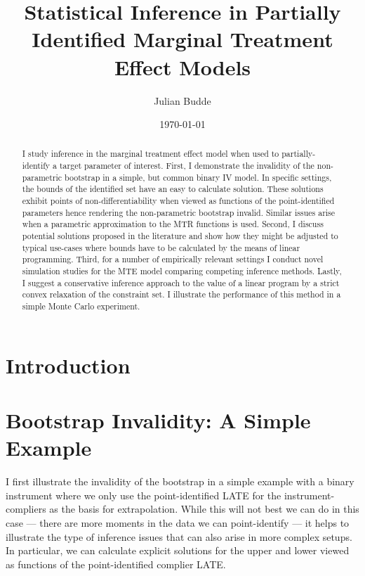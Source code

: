 \documentclass[12pt,a4paper,english]{article} %
\title{Statistical Inference in Partially Identified Marginal Treatment Effect Models}
\author{Julian Budde}
\date{\today}
\numberwithin{equation}{section}
\theoremstyle{definition}
\theoremstyle{remark}
\theoremstyle{plain}
\begin{document}
\maketitle

\begin{abstract}
	I study inference in the marginal treatment effect model when used to partially-identify a target parameter of interest.
	First, I demonstrate the invalidity of the non-parametric bootstrap in a simple, but common binary IV model.
	In specific settings, the bounds of the identified set have an easy to calculate solution.
	These solutions exhibit points of non-differentiability when viewed as functions of the point-identified parameters hence rendering the non-parametric bootstrap invalid.
	Similar issues arise when a parametric approximation to the MTR functions is used.
  Second, I discuss potential solutions proposed in the literature and show how they might be adjusted to typical use-cases where bounds have to be calculated by the means of linear programming.
	Third, for a number of empirically relevant settings I conduct novel simulation studies for the MTE model comparing competing inference methods.
  Lastly, I suggest a conservative inference approach to the value of a linear program by a strict convex relaxation of the constraint set.
  I illustrate the performance of this method in a simple Monte Carlo experiment.
\end{abstract}

\clearpage
\newpage

\tableofcontents

\clearpage
\newpage

\listoftables

\clearpage
\newpage

\listoffigures

\clearpage
\newpage

\section{Introduction}\label{sec:introduction}

\section{Bootstrap Invalidity: A Simple Example}\label{sec:simple_example}
I first illustrate the invalidity of the bootstrap in a simple example with a binary instrument where we only use the point-identified LATE for the instrument-compliers as the basis for extrapolation.
While this will not best we can do in this case --- there are more moments in the data we can point-identify --- it helps to illustrate the type of inference issues that can also arise in more complex setups.
In particular, we can calculate explicit solutions for the upper and lower viewed as functions of the point-identified complier LATE.\@
\end{document}
